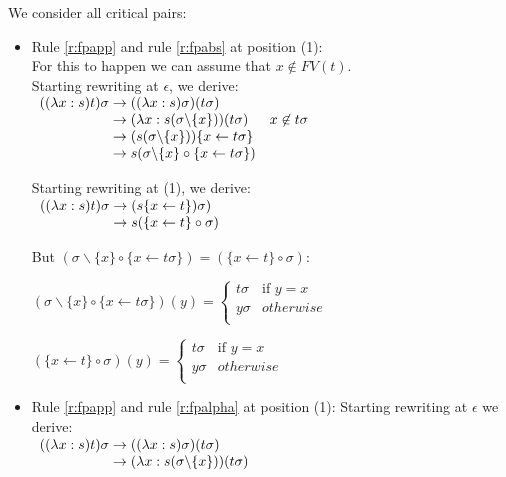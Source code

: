 \documentclass[a4paper]{article}
\newcommand{\fpsubstin}[1]{\{#1\}}
\newcommand{\fpscat}[0]{\circ}
\newcommand{\fpwith}{\leftarrow}
\newcommand{\fpwithoutset}[1]{\backslash\{#1\}}
\newcommand{\rewrites}[0]{\;\rightarrow\;}
\newcommand{\sidebyside}[2]{
    \begin{minipage}{0.45\linewidth}
      #1
    \end{minipage}
    \hspace{10pt}
    \begin{minipage}{0.45\linewidth}
      #2
    \end{minipage}
}
\begin{document}
We consider all critical pairs:
\begin{itemize}
\item Rule \ref{r:fpapp} and rule \ref{r:fpabs} at position (1):\\
  For this to happen we can assume that $x \not \in FV(t)$.\\
  Starting rewriting at $\epsilon$, we derive:\\
  $
  \begin{array}{r@{\rewrites}ll}
    ((\lambda x:s)t)\sigma & ((\lambda x:s)\sigma)(t\sigma) & \\
    & (\lambda x : s(\sigma\fpwithoutset{x}))(t\sigma) & x \not \in t\sigma\\
    & (s(\sigma\fpwithoutset{x}))\fpsubstin{x \fpwith t\sigma} & \\
    & s(\sigma\fpwithoutset{x} \fpscat \fpsubstin{x \fpwith t\sigma}) & \\
  \end{array}
  $

  Starting rewriting at (1), we derive:\\

  $
  \begin{array}{r@{\rewrites}l}
  ((\lambda x:s)t)\sigma & (s\fpsubstin{x \fpwith t})\sigma ) \\
    & s(\fpsubstin{x \fpwith t} \fpscat \sigma ) \\
  \end{array}
  $

  But $(\sigma\fpwithoutset{x} \fpscat \fpsubstin{x \fpwith t\sigma}) =
  (\fpsubstin{x \fpwith t} \fpscat \sigma)$:
  
  \sidebyside{
  $(\sigma\fpwithoutset{x} \fpscat \fpsubstin{x \fpwith t\sigma})(y) =
  \left\{
    \begin{array}{ll}
      t\sigma&\mbox{if }y=x\\
      y\sigma& otherwise\\
    \end{array}
  \right.
  $}{
  $(\fpsubstin{x \fpwith t} \fpscat \sigma) (y) =
    \left\{
      \begin{array}{ll}
        t \sigma&\mbox{if }y=x\\
        y \sigma & otherwise\\
      \end{array}
    \right.
  $
  }

\item Rule \ref{r:fpapp} and rule \ref{r:fpalpha} at position (1):
  Starting rewriting at $\epsilon$ we derive:\\
  $
  \begin{array}{r@{\rewrites}l}
    ((\lambda x:s)t)\sigma & ((\lambda x:s)\sigma)(t\sigma) \\
    & (\lambda x : s(\sigma \fpwithoutset{x}))(t\sigma) \\
  \end{array}
  $


\end{itemize}
\end{document}
